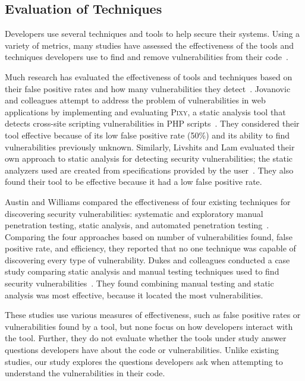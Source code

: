 \documentclass[conference]{IEEEtran}
\begin{document}
\subsection{Evaluation of Techniques}
\label{evaluation}
Developers use several techniques and tools to help secure their systems.
Using a variety of metrics, many studies have assessed the effectiveness of the tools and techniques developers use to find and remove vulnerabilities from their code~\cite{martin2005finding, austin2011one, livshits2005finding}.  

Much research has evaluated the effectiveness of tools and techniques based on their false positive rates and how many vulnerabilities they detect~\cite{jovanovic2006pixy, austin2011one, dukes2013case}. 
Jovanovic and colleagues attempt to address the problem of vulnerabilities in web applications by implementing and evaluating \textsc{Pixy}, a static analysis tool that detects cross-site scripting vulnerabilities in PHP scripts~\cite{jovanovic2006pixy}. 
They considered their tool effective because of its low false positive rate (50\%) and its ability to find vulnerabilities previously unknown. 
Similarly, Livshits and Lam evaluated their own approach to static analysis for detecting security vulnerabilities; the static analyzers used are created from specifications provided by the user~\cite{livshits2005finding}. 
They also found their tool to be effective because it had a low false positive rate. 

Austin and Williams compared the effectiveness of four existing techniques for discovering security vulnerabilities: systematic and exploratory manual  penetration testing, static analysis, and automated penetration testing~\cite{austin2011one}. 
Comparing the four approaches based on number of vulnerabilities found, false positive rate, and efficiency, they reported that no one technique was capable of discovering every type of vulnerability. 
Dukes and colleagues conducted a case study comparing static analysis and manual testing techniques used to find security vulnerabilities~\cite{dukes2013case}. 
They found combining manual testing and static analysis was most effective, because it located the most vulnerabilities.


These studies use various measures of effectiveness, such as false positive rates or vulnerabilities found by a tool, but none focus on how developers interact with the tool. 
Further, they do not evaluate whether the tools under study answer questions developers have about the code or vulnerabilities. 
Unlike existing studies, our study explores the questions developers ask when attempting to understand the vulnerabilities in their code.
\end{document}
